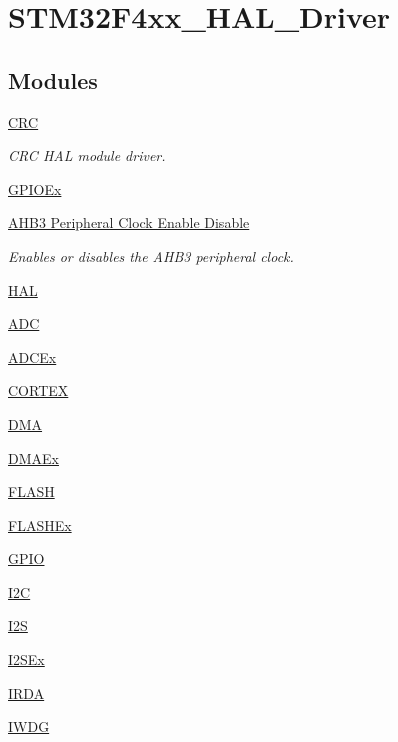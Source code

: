\hypertarget{group___s_t_m32_f4xx___h_a_l___driver}{}\section{S\+T\+M32\+F4xx\+\_\+\+H\+A\+L\+\_\+\+Driver}
\label{group___s_t_m32_f4xx___h_a_l___driver}
\subsection*{Modules}
\begin{DoxyCompactItemize}
\item 
\hyperlink{group___c_r_c}{C\+RC}
\begin{DoxyCompactList}\small\item\em C\+RC H\+AL module driver. \end{DoxyCompactList}\item 
\hyperlink{group___g_p_i_o_ex}{G\+P\+I\+O\+Ex}
\item 
\hyperlink{group___r_c_c_ex___a_h_b3___clock___enable___disable}{A\+H\+B3 Peripheral Clock Enable Disable}
\begin{DoxyCompactList}\small\item\em Enables or disables the A\+H\+B3 peripheral clock. \end{DoxyCompactList}\item 
\hyperlink{group___h_a_l}{H\+AL}
\item 
\hyperlink{group___a_d_c}{A\+DC}
\item 
\hyperlink{group___a_d_c_ex}{A\+D\+C\+Ex}
\item 
\hyperlink{group___c_o_r_t_e_x}{C\+O\+R\+T\+EX}
\item 
\hyperlink{group___d_m_a}{D\+MA}
\item 
\hyperlink{group___d_m_a_ex}{D\+M\+A\+Ex}
\item 
\hyperlink{group___f_l_a_s_h}{F\+L\+A\+SH}
\item 
\hyperlink{group___f_l_a_s_h_ex}{F\+L\+A\+S\+H\+Ex}
\item 
\hyperlink{group___g_p_i_o}{G\+P\+IO}
\item 
\hyperlink{group___i2_c}{I2C}
\item 
\hyperlink{group___i2_s}{I2S}
\item 
\hyperlink{group___i2_s_ex}{I2\+S\+Ex}
\item 
\hyperlink{group___i_r_d_a}{I\+R\+DA}
\item 
\hyperlink{group___i_w_d_g}{I\+W\+DG}

\end{DoxyCompactItemize}
